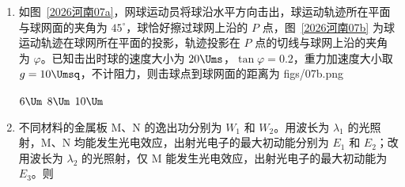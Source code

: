 \documentclass[\gkver]{gaokaozhenti}
\begin{document}
\begin{enumerate}
{由几何关系，可知 $\triangle O_{2}BC$ 与 $\triangle O_{1}AB$ 相似，则 $\frac{r_{\text{下}}}{r_{\text{上}}}=\frac{O_{1}A}{BC}$

由勾股定理得 $O_{1}A=\sqrt{r_{\text{下}}^{2}-l^{2}}=\frac{4l}{3}$

且 $BC=AO=r_{\text{下}}-O_{1}A=\frac{l}{3}$

联立解得 $\frac{B_{\text{上}}}{B_{\text{下}}}=\frac{O_{1}A}{BC}=\frac{4}{1}$

故选 C。
}

\item
如图~\ref{2026河南07a}，网球运动员将球沿水平方向击出，球运动轨迹所在平面与球网面的夹角为 $45^{\circ}$，球恰好擦过球网上沿的 $P$ 点，图~\ref{2026河南07b} 为球运动轨迹在球网所在平面的投影，轨迹投影在 $P$ 点的切线与球网上沿的夹角为 $\varphi$。已知击出时球的速度大小为 $20\Ums$，$\tan\varphi=0.2$，重力加速度大小取 $g=10\Umsq$，不计阻力，则击球点到球网面的距离为 
{figs/07b.png}

\fourchoices[answer=A]
{$4\Um$}
{$6\Um$}
{$8\Um$}
{$10\Um$}


\item
不同材料的金属板 M、N 的逸出功分别为 $W_{1}$ 和 $W_{2}$。用波长为 $\lambda_{1}$ 的光照射，M、N 均能发生光电效应，出射光电子的最大初动能分别为 $E_{1}$ 和 $E_{2}$；改用波长为 $\lambda_{2}$ 的光照射，仅 M 能发生光电效应，出射光电子的最大初动能为 $E_{3}$。则 


\end{enumerate}
\end{document}
